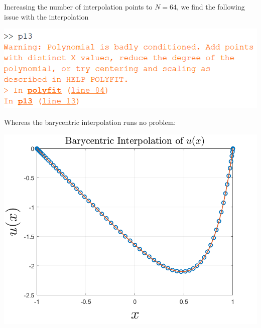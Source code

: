 \documentclass{article}
\begin{document}
Increasing the number of interpolation points to $N = 64$, we find the following issue with the  interpolation
\begin{center}
    \includegraphics[scale = 0.9]{err}
\end{center}
Whereas the barycentric interpolation runs no problem:
\begin{center}
    \includegraphics[scale = 0.4]{barycentric64}
\end{center}
\end{document}

